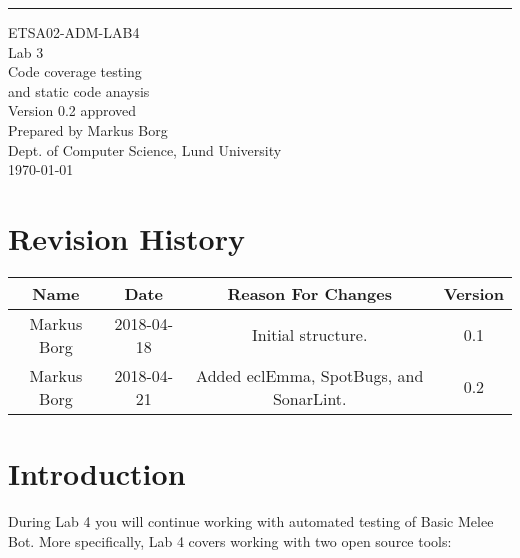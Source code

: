 \documentclass{scrreprt}
\date{}
\def\myversion{0.2 }
\begin{document}
\begin{flushright}
    \rule{16cm}{5pt}\vskip1cm
    \begin{bfseries}
    	\LARGE{ETSA02-ADM-LAB4}\\
    	\vspace{1.5cm}
        \Huge{Lab 3}\\
        \vspace{0.5cm}
        Code coverage testing\\
        \vspace{0.5cm}
        and static code anaysis\\
        \vspace{1.5cm}
        \LARGE{Version \myversion approved}\\
        \vspace{1.5cm}
        Prepared by Markus Borg\\
        Dept. of Computer Science, Lund University\\
        \vspace{1.5cm}
        \today\\
    \end{bfseries}
\end{flushright}


\chapter*{Revision History}

\begin{center}
    \begin{tabular}{|c|c|c|c|}
        \hline
	    Name & Date & Reason For Changes & Version\\
        \hline
	    Markus Borg & 2018-04-18 & Initial structure. & 0.1\\
        \hline
        Markus Borg & 2018-04-21 & Added eclEmma, SpotBugs, and SonarLint. & 0.2\\
        \hline
    \end{tabular}
\end{center}

\chapter{Introduction}
During Lab 4 you will continue working with automated testing of Basic Melee Bot. More specifically, Lab 4 covers working with two open source tools:
\end{document}
